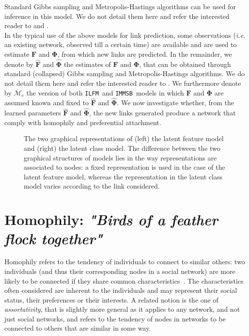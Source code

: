 \documentclass[journal]{IEEEtran}
\newcommand*{\lpath}{./}
\newcommand{\ifm}{\texttt{ILFM}}
\newcommand{\imb}{\texttt{IMMSB}}
\newcommand{\mat}[1]{\mathbf{#1}}
\begin{document}
Standard Gibbs sampling and Metropolis-Hastings algorithms can be used for inference in this model. We do not detail them here and refer the interested reader to \cite{ILFRM} and \cite{IBP}.~\\

In the typical use of the above models for link prediction, some observations (\textit{i.e.} an existing network, observed till a certain time) are available and are used to estimate $\mat{F}$ and $\mat{\Phi}$, from which new links are predicted. In the remainder, we denote by $\mat{\hat{F}}$ and $\mat{\hat{\Phi}}$ the estimates of $\mat{F}$ and $\mat{\Phi}$, that can be obtained through standard (collapsed) Gibbs sampling and Metropolis-Hastings algorithms. We do not detail them here and refer the interested reader to \cite{ILFRM,IBP,HDP,fan2015dynamic}. We furthermore denote by $\mathcal{M}_e$ the version of both \ifm\ and \imb\ models in which $\mat{F}$ and $\mat{\Phi}$ are assumed known and fixed to $\mat{\hat{F}}$ and $\mat{\hat{\Phi}}$. We now investigate whether, from the learned parameters $\mat{\hat{F}}$ and $\mat{\hat{\Phi}}$, the new links generated produce a network that comply with homophily and preferential attachment.

\begin{figure}[t]
	\centering
	\vspace{1cm}
	\scalebox{0.88}{
	}
	\endminipage
	\scalebox{0.88}{
		}
	\endminipage
	\caption{The two graphical representations of (left) the latent feature model and (right) the latent class model. The difference between the two graphical structures of  models lies in the way representations are associated to nodes: a fixed representation is used in the case of the latent feature model, whereas the representation in the latent class model varies according to the link considered.}
	\label{fig:mmm}
\end{figure}

\section{Homophily: \emph{"Birds of a feather flock together"}}
\label{sec:homophily}

Homophily refers to the tendency of individuals to connect to similar others: two individuals (and thus their corresponding nodes in a social network) are more likely to be connected if they share common characteristics~\cite{mcpherson2001birds,lazarsfeld1954friendship}. The characteristics often considered are inherent to the individuals and may represent their social status, their preferences or their interests. A related notion is the one of {\it assortativity}, that is slightly more general as it applies to any network, and not just social networks, and refers to the tendency of nodes in networks to be connected to others that are similar in some way.~\\
\end{document}
